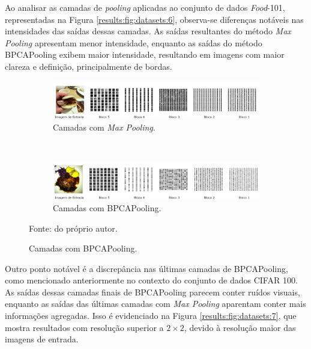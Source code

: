 Ao analisar as camadas de \textit{pooling} aplicadas ao conjunto de dados \textit{Food}-101, representadas na Figura \ref{results:fig:datasets:6}, observa-se diferenças notáveis nas intensidades das saídas dessas camadas. As saídas resultantes do método \textit{Max Pooling} apresentam menor intensidade, enquanto as saídas do método BPCAPooling exibem maior intensidade, resultando em imagens com maior clareza e definição, principalmente de bordas.

\begin{figure}[H]
   \caption{Resultado visual de camadas de \textit{pooling} do conjunto \textit{Food}-101.}
   \centering
   \label{results:fig:datasets:6}
    \begin{subfigure}[t]{0.9\textwidth}
        \centering
        \includegraphics[width=1\linewidth]{recursos/imagens/results/max_by_layer.png}
        \caption{Camadas com \textit{Max Pooling}.}
        \label{results:fig:datasets:6.1}
    \end{subfigure}%
    ~ 

    \begin{subfigure}[t]{0.9\textwidth}
        \centering
        \includegraphics[width=1\linewidth]{recursos/imagens/results/bpca_by_layer.png}
        \caption{Camadas com BPCAPooling.}
        \label{results:fig:datasets:6.2}
    \end{subfigure}%

    Fonte: do próprio autor.
\end{figure}

Outro ponto notável é a discrepância nas últimas camadas de BPCAPooling, como mencionado anteriormente no contexto do conjunto de dados CIFAR 100. As saídas dessas camadas finais de BPCAPooling parecem conter ruídos visuais, enquanto as saídas das últimas camadas com \textit{Max Pooling} aparentam conter mais informações agregadas. Isso é evidenciado na Figura \ref{results:fig:datasets:7}, que mostra resultados com resolução superior a $2 \times 2$, devido à resolução maior das imagens de entrada.

